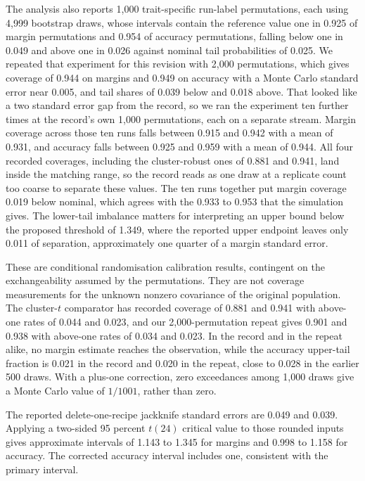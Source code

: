 The analysis also reports 1,000 trait-specific run-label permutations, each using 4,999 bootstrap draws, whose intervals contain the reference value one in 0.925 of margin permutations and 0.954 of accuracy permutations, falling below one in 0.049 and above one in 0.026 against nominal tail probabilities of 0.025. We repeated that experiment for this revision with 2,000 permutations, which gives coverage of 0.944 on margins and 0.949 on accuracy with a Monte Carlo standard error near 0.005, and tail shares of 0.039 below and 0.018 above. That looked like a two standard error gap from the record, so we ran the experiment ten further times at the record's own 1,000 permutations, each on a separate stream. Margin coverage across those ten runs falls between 0.915 and 0.942 with a mean of 0.931, and accuracy falls between 0.925 and 0.959 with a mean of 0.944. All four recorded coverages, including the cluster-robust ones of 0.881 and 0.941, land inside the matching range, so the record reads as one draw at a replicate count too coarse to separate these values. The ten runs together put margin coverage 0.019 below nominal, which agrees with the 0.933 to 0.953 that the simulation gives. The lower-tail imbalance matters for interpreting an upper bound below the proposed threshold of 1.349, where the reported upper endpoint leaves only 0.011 of separation, approximately one quarter of a margin standard error.

These are conditional randomisation calibration results, contingent on the exchangeability assumed by the permutations. They are not coverage measurements for the unknown nonzero covariance of the original population. The cluster-$t$ comparator has recorded coverage of 0.881 and 0.941 with above-one rates of 0.044 and 0.023, and our 2,000-permutation repeat gives 0.901 and 0.938 with above-one rates of 0.034 and 0.023. In the record and in the repeat alike, no margin estimate reaches the observation, while the accuracy upper-tail fraction is 0.021 in the record and 0.020 in the repeat, close to 0.028 in the earlier 500 draws. With a plus-one correction, zero exceedances among 1,000 draws give a Monte Carlo value of $1/1001$, rather than zero.

The reported delete-one-recipe jackknife standard errors are 0.049 and 0.039. Applying a two-sided 95 percent $t(24)$ critical value to those rounded inputs gives approximate intervals of 1.143 to 1.345 for margins and 0.998 to 1.158 for accuracy. The corrected accuracy interval includes one, consistent with the primary interval.

